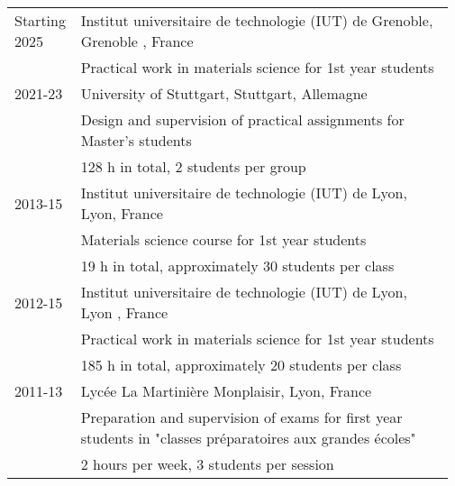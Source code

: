 \documentclass[a4paper,11pt]{concours}
\begin{document}
\begin{table}[htbp]
\begin{tabular}{@{} p{0.13\linewidth} p{0.84\linewidth} @{}}
\vspace{-0.3cm}
Starting 2025 & Institut universitaire de technologie (IUT) de Grenoble, Grenoble , France \\
& Practical work in materials science for 1st year students \\ 
\hline \hline
2021-23 & University of Stuttgart, Stuttgart, Allemagne \\
& Design and supervision of practical assignments for Master's students\\
& 128 h in total, 2 students per group \\
\hline \hline
2013-15 & Institut universitaire de technologie (IUT) de Lyon, Lyon, France \\
& Materials science course for 1st year students \\
& 19 h in total, approximately 30 students per class \\
\hline \hline
2012-15 & Institut universitaire de technologie (IUT) de Lyon, Lyon , France \\
& Practical work in materials science for 1st year students \\ 
& 185 h in total, approximately 20 students per class \\
\hline \hline
2011-13 & Lycée La Martinière Monplaisir, Lyon, France \\
& Preparation and supervision of exams for first year students in "classes préparatoires
aux grandes écoles" \\
& 2 hours per week, 3 students per session \\
\end{tabular}
\end{table}


\newpage
\end{document}
